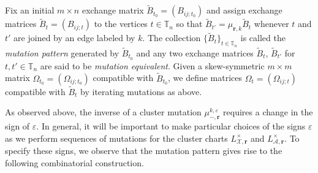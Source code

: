 \documentclass{amsart}
\numberwithin{equation}{section}
\newcommand{\bfr}{{\boldsymbol{r}}}
\newcommand{\cA}{\mathcal{A}}
\newcommand{\cX}{\mathcal{X}}
\newcommand{\TT}{\mathbb{T}}
\begin{document}
Fix an initial $m\times n$ exchange matrix $\tilde B_{t_0}=(B_{ij;t_0})$ and assign exchange matrices $\tilde B_t=(B_{ij;t})$ to the vertices $t\in\TT_n$ so that $\tilde B_{t'}=\mu_{\bfr,k}\tilde B_t$ whenever $t$ and $t'$ are joined by an edge labeled by $k$.
The collection $\{\tilde B_t\}_{t\in\TT_n}$ is called the \emph{mutation pattern} generated by $\tilde B_{t_0}$ and any two exchange matrices $\tilde B_t$, $\tilde B_{t'}$ for $t,t'\in\TT_n$ are said to be \emph{mutation equivalent}.
Given a skew-symmetric $m\times m$ matrix $\Omega_{t_0}=(\Omega_{ij;t_0})$ compatible with $\tilde B_{t_0}$, we define matrices $\Omega_t=(\Omega_{ij;t})$ compatible with $\tilde B_t$ by iterating mutations as above.

As observed above, the inverse of a cluster mutation $\mu_{-,\bfr}^{k,\varepsilon}$ requires a change in the sign of $\varepsilon$.
In general, it will be important to make particular choices of the signs $\varepsilon$ as we perform sequences of mutations for the cluster charts $L^\times_{\cX,\bfr}$ and $L^\times_{\cA,\bfr}$.
To specify these signs, we observe that the mutation pattern gives rise to the following combinatorial construction.
\end{document}
